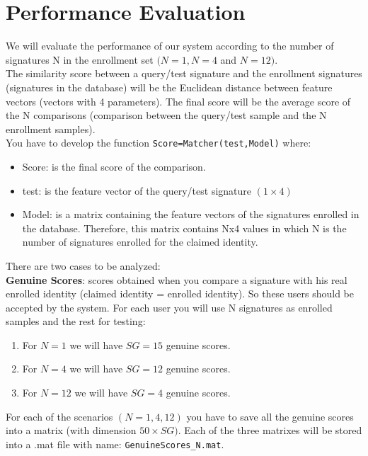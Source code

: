\documentclass[a4paper]{article}
\def\inline{\lstinline[basicstyle=\ttfamily,keywordstyle={}]}
\begin{document}
{\section{Performance Evaluation}

We will evaluate the performance of our system according to the number of signatures N in the enrollment set \((N=1, N=4 \) and \(N=12)\).\\

The similarity score between a query/test signature and the enrollment signatures (signatures in the database) will be the Euclidean distance between feature vectors (vectors with 4 parameters).  The final score will be the average score of the N comparisons (comparison between the query/test sample and the N enrollment samples).\\

You have to develop the function \inline{Score=Matcher(test,Model)} where:
\begin{itemize}
\item	Score: is the final score of the comparison.
\item	test: is the feature vector of the query/test signature \((1\times4)\)
\item	Model: is a matrix containing the feature vectors of the signatures enrolled in the database. Therefore, this matrix contains Nx4 values in which N is the number of signatures enrolled for the claimed identity.
\end{itemize}
There are two cases to be analyzed:\\

\textbf{Genuine Scores}: scores obtained when you compare a signature with his real enrolled identity (claimed identity = enrolled identity). So these users should be accepted by the system. For each user you will use N signatures as enrolled samples and the rest for testing:
\begin{enumerate}
\item	For \(N=1\) we will have \(SG=15\) genuine scores.
\item	For \(N=4\) we will have \(SG=12\) genuine scores.
\item	For \(N=12\) we will have \(SG=4\) genuine scores.
\end{enumerate}
For each of the scenarios \((N=1,4,12)\) you have to save all the genuine scores into a matrix (with dimension \(50 \times SG)\). Each of the three matrixes will be stored into a .mat file with name: \inline{GenuineScores_N.mat}.\\

}
\end{document}
